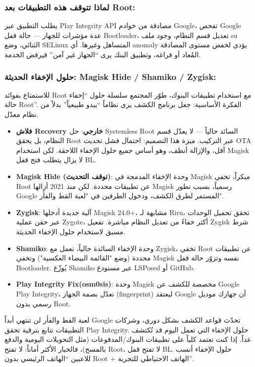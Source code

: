 \subsubsection*{لماذا تتوقف هذه التطبيقات بعد Root:}

يطلب التطبيق عبر Play Integrity API مصادقة من خوادم Google، تفحص Google عدة مؤشرات للجهاز — حالة قفل Bootloader، تعديل قسم النظام، وجود ملف su الثنائي، وضع SELinux المتساهل وغيرها. أي anomaly يؤدي لخفض مستوى المصادقة المُعاد أو فراغه، وتطبيق البنك يرى “الجهاز غير آمن” فيرفض الخدمة.

\subsubsection*{حلول الإخفاء الحديثة: Magisk Hide / Shamiko / Zygisk:}

للاستمتاع بفوائد Root مع استخدام تطبيقات البنوك، طوّر المجتمع سلسلة حلول “إخفاء حالة Root”. الفكرة الأساسية: جعل برنامج الكشف يرى نظاماً “يبدو طبيعياً” بدلاً من نظام معدّل.

\begin{itemize}
  \item \textbf{فلاش Recovery خارجي}: حل Systemless Root السائد حالياً — لا يعدّل قسم النظام، بل يحقق Root عبر التركيب. ميزة هذا التصميم: احتمال فشل تحديث OTA أقل، والإزالة أنظف، وهو أساس جميع حلول الإخفاء اللاحقة. لكن استخدام Magisk لا يزال يتطلب فتح قفل BL.
  \item \textbf{Magisk Hide (توقف التحديث)}: وحدة الإخفاء المدمجة في Magisk مبكراً، تخفي Root عن تطبيقات محددة. لكن منذ 2021 أزالها Magisk رسمياً، بسبب تطور Google المستمر لطرق الكشف، ودخول الطرفين في "لعبة القط والفأر".
  \item \textbf{Zygisk}: آلية جديدة أدخلها Magisk 24.0+، مشابهة لـ Riru، تحقق تحميل الوحدات عبر حقن عملية Zygote، أكثر خفاءً من تعديل النظام مباشرة. تفعيل Zygisk شرط مسبق لاستخدام حلول الإخفاء الحديثة.
  \item \textbf{Shamiko}: وحدة الإخفاء السائدة حالياً، تعمل مع Zygisk، تخفي Root عن تطبيقات محددة (وضع "القائمة البيضاء العكسية") وتخفي Magisk نفسه وتزوّر حالة قفل Bootloader. يُوزّع Shamiko عبر مستودع LSPosed أو GitHub.
  \item \textbf{Play Integrity Fix(osm0sis)}: وحدة Magisk مخصصة للكشف عن Google Play Integrity، تعدّل بصمة الجهاز (fingerprint) ليعتقد Google أن جهازك موديل رسمي بدون Root.
\end{itemize}

\begin{tcbwarn}{لعبة القط والفأر لن تنتهي أبداً}
Google تحدّث قواعد الكشف بشكل دوري، وشركات التطبيقات تتابع بترقية تحقق Play Integrity. حلول الإخفاء التي تعمل اليوم قد تُكتشف غداً. إذا كنت تعتمد كلياً على تطبيقات البنوك/المدفوعات (مثل التحويلات اليومية والدفع بالمسح)، فالخيار الأكثر أماناً: لا تفتح Root، لا تفتح قفل BL. حلول الإخفاء أنسب للاعبين “الهاتف الرئيسي بدون Root + الهاتف الاحتياطي للتجربة”.

\end{tcbwarn}

